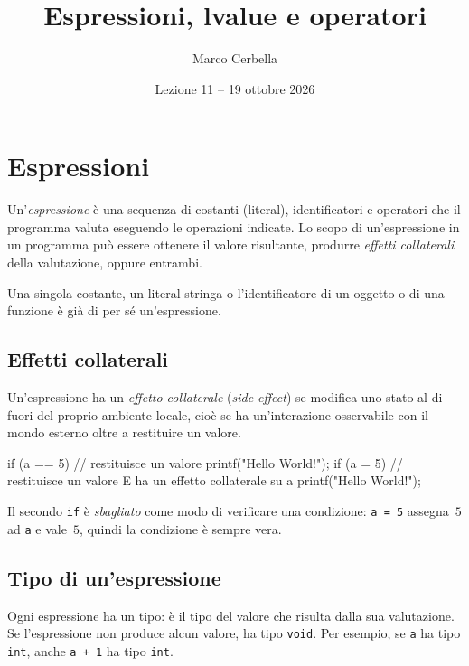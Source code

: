 \documentclass[11pt,a4paper]{article}
\title{Espressioni, lvalue e operatori}
\author{Marco Cerbella}
\date{Lezione 11 -- 19 ottobre 2026}
\begin{document}
\maketitle

\section{Espressioni}

\begin{definizione}
Un'\emph{espressione} è una sequenza di costanti (literal), identificatori e operatori che il programma valuta eseguendo le operazioni indicate. Lo scopo di un'espressione in un programma può essere ottenere il valore risultante, produrre \emph{effetti collaterali} della valutazione, oppure entrambi.
\end{definizione}

Una singola costante, un literal stringa o l'identificatore di un oggetto o di una funzione è già di per sé un'espressione.

\subsection{Effetti collaterali}

Un'espressione ha un \emph{effetto collaterale} (\emph{side effect}) se modifica uno stato al di fuori del proprio ambiente locale, cioè se ha un'interazione osservabile con il mondo esterno oltre a restituire un valore.

\begin{codice}
if (a == 5) {              // restituisce un valore
    printf("Hello World!\n");
}
if (a = 5) {               // restituisce un valore E ha un effetto collaterale su a
    printf("Hello World!\n");
}
\end{codice}

\begin{osservazione}
Il secondo \lstinline|if| è \emph{sbagliato} come modo di verificare una condizione: \lstinline|a = 5| assegna~$5$ ad \lstinline|a| e vale~$5$, quindi la condizione è sempre vera.
\end{osservazione}

\subsection{Tipo di un'espressione}

Ogni espressione ha un tipo: è il tipo del valore che risulta dalla sua valutazione. Se l'espressione non produce alcun valore, ha tipo \lstinline|void|. Per esempio, se \lstinline|a| ha tipo \lstinline|int|, anche \lstinline|a + 1| ha tipo \lstinline|int|.
\end{document}
